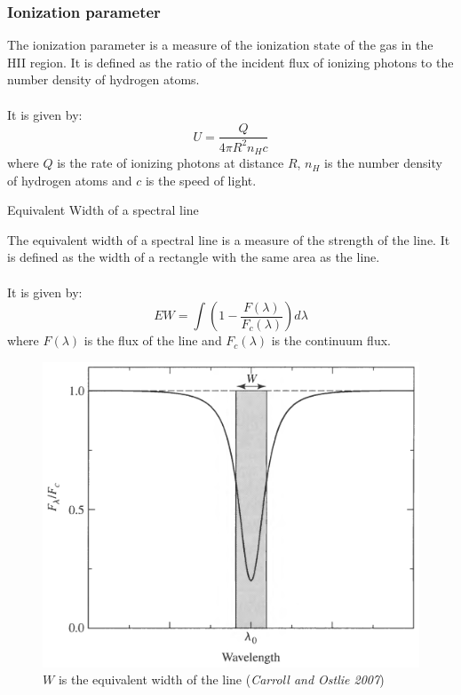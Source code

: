 \documentclass{beamer}
\begin{document}
\begin{frame}
    \frametitle{Ionization parameter}

    The ionization parameter is a measure of the ionization state of the gas in the HII region. It is defined as the ratio of the incident flux of ionizing photons to the number density of hydrogen atoms. 
    \\~\\
    It is given by: 
    \begin{equation}
        U = \frac{Q}{4\pi R^2 n_H c}
    \end{equation}
    where $Q$ is the rate of ionizing photons at distance $R$, $n_H$ is the number density of hydrogen atoms and $c$ is the speed of light.
\end{frame}

\begin{frame}{Equivalent Width of a spectral line}
    
    The equivalent width of a spectral line is a measure of the strength of the line. It is defined as the width of a rectangle with the same area as the line. 
    \\~\\
    It is given by: 
    \begin{equation}
        EW = \int \left(1 - \frac{F(\lambda)}{F_c(\lambda)}\right) d\lambda
    \end{equation}
    where $F(\lambda)$ is the flux of the line and $F_c(\lambda)$ is the continuum flux.

    \begin{figure}[H]
        \centering
        \includegraphics[scale = 0.09]{image3.png}
        \caption{$W$ is the equivalent width of the line (\textit{Carroll and Ostlie 2007})}
        \label{fig:image3}
    \end{figure}

\end{frame}
\end{document}
